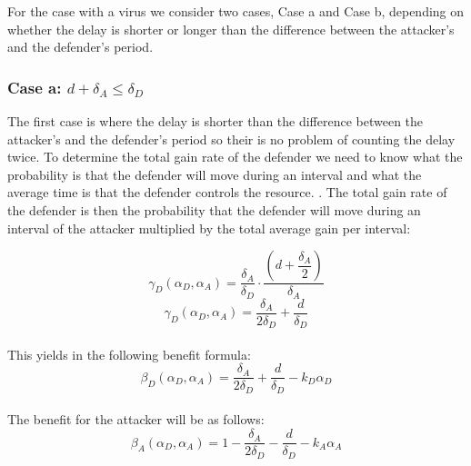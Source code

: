 For the case with a virus we consider two cases, Case a and Case b, depending on whether the delay is shorter or longer than the difference between the attacker's and the defender's period.  \\


\subsubsection*{\textbf{Case a:} $d + \delta_{A} \leq \delta_{D}$}
The first case is where the delay is shorter than the difference between the attacker's and the defender's period so their is no problem of counting the delay twice. To determine the total gain rate of the defender we need to know what the probability is that the defender will move during an interval and what the average time is that the defender controls the resource. .
The total gain  rate of the defender is then the probability that the defender will move during an interval of the attacker multiplied by the total average gain per interval: 

\begin{equation*}\label{first}
\gamma_{D}(\alpha_{D},\alpha_{A}) = \dfrac{\delta_{A}}{\delta_{D}} \cdot \dfrac{(d+\dfrac{\delta_{A}}{2})}{\delta_{A}} 
\end{equation*}
\begin{equation*}\label{first}
\gamma_{D}(\alpha_{D},\alpha_{A}) = \dfrac{\delta_{A}}{2\delta_{D}} + \dfrac{d}{\delta_{D}} 
\end{equation*}\\
This yields in the following benefit formula:
\begin{equation*}\label{first}
\beta_{D}(\alpha_{D},\alpha_{A}) = \dfrac{\delta_{A}}{2\delta_{D}} + \dfrac{d}{\delta_{D}} - k_{D} \alpha_{D} 
\end{equation*}\\

The benefit for the attacker will be as follows:
\begin{equation*}\label{first}
\beta_{A}(\alpha_{D},\alpha_{A}) = 1 -\dfrac{\delta_{A}}{2\delta_{D}} - \dfrac{d}{\delta_{D}} - k_{A} \alpha_{A} 
\end{equation*}\\

